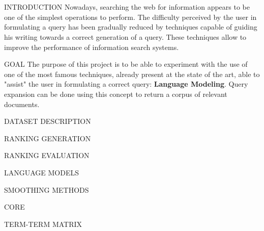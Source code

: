 \section{}

\begin{frame}{INTRODUCTION}
    Nowadays, searching the web for information appears to be one of the 
    simplest operations to perform. The difficulty perceived by the user in 
    formulating a query has been gradually reduced by techniques capable of 
    guiding his writing towards a correct generation of a query. These 
    techniques allow to improve the performance of information search 
    systems.
\end{frame}

\begin{frame}{GOAL}
    The purpose of this project is to be able to experiment with the use of 
    one of the most famous techniques, already present at the state of the 
    art, able to "assist" the user in formulating a correct query: {\bfseries Language Modeling}. Query expansion can be done using this concept to return a corpus of relevant documents.
\end{frame}

\begin{frame}{DATASET DESCRIPTION}
    
\end{frame}

\begin{frame}{RANKING GENERATION}
    
\end{frame}

\begin{frame}{RANKING EVALUATION}
    
\end{frame}

\begin{frame}{LANGUAGE MODELS}
    
\end{frame}

\begin{frame}{SMOOTHING METHODS}
    
\end{frame}

\begin{frame}{CORE}
    
\end{frame}

\begin{frame}{TERM-TERM MATRIX}
    
\end{frame}

